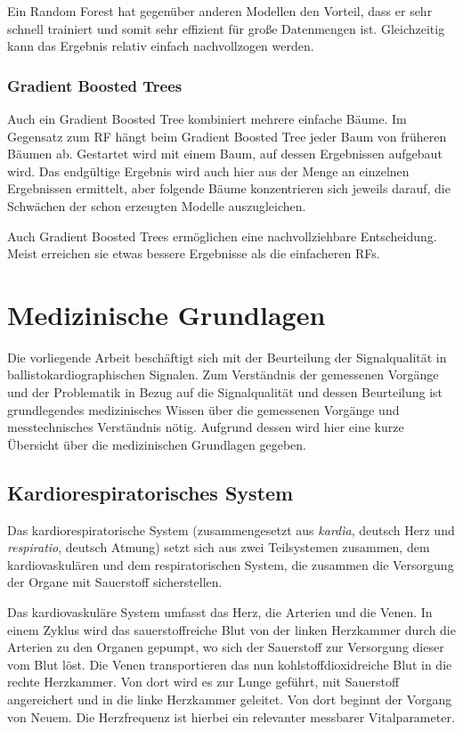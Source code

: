 		Ein Random Forest hat gegenüber anderen Modellen den Vorteil, dass er sehr schnell trainiert und somit sehr effizient für große Datenmengen ist. Gleichzeitig kann das Ergebnis relativ einfach nachvollzogen werden.
		
		\subsubsection{Gradient Boosted Trees}
		
		Auch ein Gradient Boosted Tree kombiniert mehrere einfache Bäume. Im Gegensatz zum \ac{RF} hängt beim Gradient Boosted Tree jeder Baum von früheren Bäumen ab. Gestartet wird mit einem Baum, auf dessen Ergebnissen aufgebaut wird. Das endgültige Ergebnis wird auch hier aus der Menge an einzelnen Ergebnissen ermittelt, aber folgende Bäume konzentrieren sich jeweils darauf, die Schwächen der schon erzeugten Modelle auszugleichen.
		
		Auch Gradient Boosted Trees ermöglichen eine nachvollziehbare Entscheidung. Meist erreichen sie etwas bessere Ergebnisse als die einfacheren \acl{RF}s.

\section{Medizinische Grundlagen}\label{med-grundlagen}

Die vorliegende Arbeit beschäftigt sich mit der Beurteilung der Signalqualität in ballistokardiographischen Signalen. Zum Verständnis der gemessenen Vorgänge und der Problematik in Bezug auf die Signalqualität und dessen Beurteilung ist grundlegendes medizinisches Wissen über die gemessenen Vorgänge und messtechnisches Verständnis nötig. Aufgrund dessen wird hier eine kurze Übersicht über die medizinischen Grundlagen gegeben.

	\subsection{Kardiorespiratorisches System}
	
	Das kardiorespiratorische System (zusammengesetzt aus \textit{kardìa}, deutsch \glq Herz\grq{} und \textit{respiratio}, deutsch \glq Atmung\grq) setzt sich aus zwei Teilsystemen zusammen, dem kardiovaskulären und dem respiratorischen System, die zusammen die Versorgung der Organe mit Sauerstoff sicherstellen.
	
	Das kardiovaskuläre System umfasst das Herz, die Arterien und die Venen. In einem Zyklus wird das sauerstoffreiche Blut von der linken Herzkammer durch die Arterien zu den Organen gepumpt, wo sich der Sauerstoff zur Versorgung dieser vom Blut löst. Die Venen transportieren das nun kohlstoffdioxidreiche Blut in die rechte Herzkammer. Von dort wird es zur Lunge geführt, mit Sauerstoff angereichert und in die linke Herzkammer geleitet. Von dort beginnt der Vorgang von Neuem. Die Herzfrequenz ist hierbei ein relevanter messbarer Vitalparameter.
	
